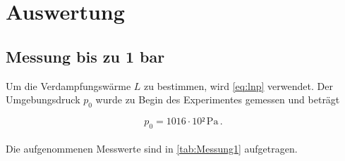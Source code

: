 \section{Auswertung}
\label{sec:auswertung}

\subsection{Messung bis zu 1 bar}
\label{subsec:Auswertung_a}
Um die Verdampfungswärme $L$ zu bestimmen, wird \eqref{eq:lnp} verwendet. 
Der Umgebungsdruck $p_0$ wurde zu Begin des Experimentes gemessen und beträgt 

\begin{equation*}
    p_0 = 1016 \cdot 10² \,\unit{\pascal}    \,.
\end{equation*} \\

Die aufgenommenen Messwerte sind in \autoref{tab:Messung1} aufgetragen.

